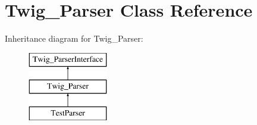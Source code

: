 \hypertarget{classTwig__Parser}{}\section{Twig\+\_\+\+Parser Class Reference}
\label{classTwig__Parser}
Inheritance diagram for Twig\+\_\+\+Parser\+:\begin{figure}[H]
\begin{center}
\leavevmode
\includegraphics[height=3.000000cm]{classTwig__Parser}
\end{center}
\end{figure}
